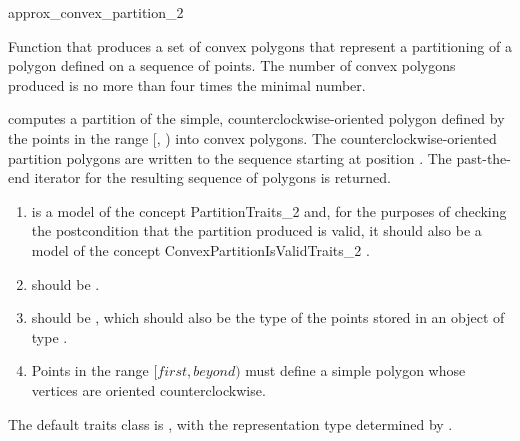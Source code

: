 \begin{ccRefFunction}{approx_convex_partition_2}

\ccDefinition
Function that produces a set of 
convex polygons that represent a partitioning of a polygon defined
on a sequence of points.  The number of convex polygons produced is 
no more than four times the minimal number.%



{
computes a partition of the simple, counterclockwise-oriented polygon defined 
by the points in the range [, ) into convex 
polygons. The counterclockwise-oriented partition polygons are written to
the sequence starting at position .  The past-the-end iterator for 
the resulting sequence of polygons is returned.
}

\begin{enumerate}
    \item {} is a model of the concept 
          PartitionTraits\_2
          and, for the purposes of checking the postcondition that the partition
          produced is valid, it should also be a model of
          the concept ConvexPartitionIsValidTraits\_2%
          .
    \item {} should be .
    \item {} should be ,
          which should also be the type of the points stored in an object
          of type .
    \item Points in the range $[first, beyond)$ must define a simple polygon
          whose vertices are oriented counterclockwise.
\end{enumerate}

The default traits class  is ,%
with the representation type determined by .


\end{ccRefFunction}
